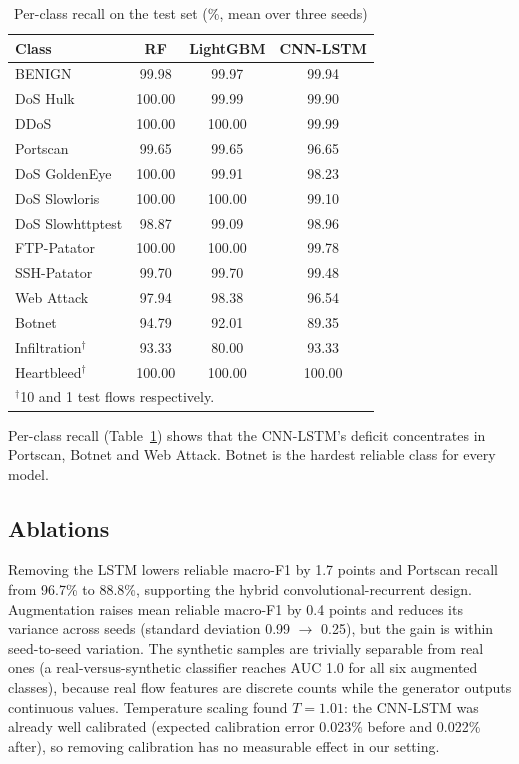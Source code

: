 \documentclass[conference]{IEEEtran}
\begin{document}
\begin{table}[t]
\caption{Per-class recall on the test set (\%, mean over three seeds)}
\label{tab:perclass}
\centering
\footnotesize
\begin{tabular}{lccc}
\toprule
Class & RF & LightGBM & CNN-LSTM \\
\midrule
BENIGN & 99.98 & 99.97 & 99.94 \\
DoS Hulk & 100.00 & 99.99 & 99.90 \\
DDoS & 100.00 & 100.00 & 99.99 \\
Portscan & 99.65 & 99.65 & 96.65 \\
DoS GoldenEye & 100.00 & 99.91 & 98.23 \\
DoS Slowloris & 100.00 & 100.00 & 99.10 \\
DoS Slowhttptest & 98.87 & 99.09 & 98.96 \\
FTP-Patator & 100.00 & 100.00 & 99.78 \\
SSH-Patator & 99.70 & 99.70 & 99.48 \\
Web Attack & 97.94 & 98.38 & 96.54 \\
Botnet & 94.79 & 92.01 & 89.35 \\
Infiltration$^\dagger$ & 93.33 & 80.00 & 93.33 \\
Heartbleed$^\dagger$ & 100.00 & 100.00 & 100.00 \\
\bottomrule
\multicolumn{4}{l}{$^\dagger$10 and 1 test flows respectively.}
\end{tabular}
\end{table}

Per-class recall (Table~\ref{tab:perclass}) shows that the CNN-LSTM's deficit concentrates in
Portscan, Botnet and Web Attack. Botnet is the hardest reliable class for every model.

\subsection{Ablations}
Removing the LSTM lowers reliable macro-F1 by 1.7 points and Portscan recall from 96.7\% to
88.8\%, supporting the hybrid convolutional-recurrent design. Augmentation raises mean reliable
macro-F1 by 0.4 points and reduces its variance across seeds (standard deviation 0.99 $\rightarrow$
0.25), but the gain is within seed-to-seed variation. The synthetic samples are trivially
separable from real ones (a real-versus-synthetic classifier reaches AUC 1.0 for all six augmented
classes), because real flow features are discrete counts while the generator outputs continuous
values. Temperature scaling found $T=1.01$: the CNN-LSTM was already well calibrated (expected
calibration error 0.023\% before and 0.022\% after), so removing calibration has no measurable
effect in our setting.
\end{document}
